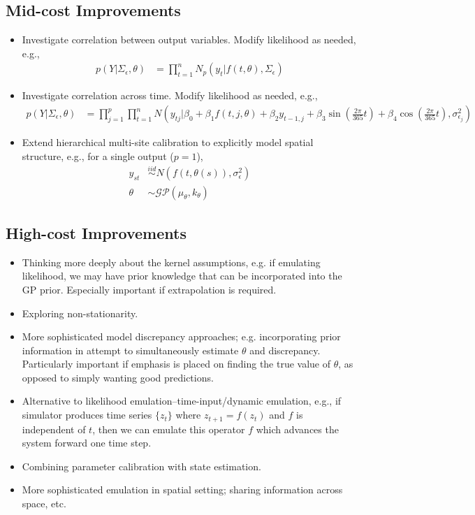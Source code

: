 \documentclass[12pt]{article}
\begin{document}
\subsection{Mid-cost Improvements}
\begin{itemize}
\item Investigate correlation between output variables. Modify likelihood as needed, e.g.,
	\begin{align}
	p(Y|\Sigma_\epsilon, \theta) &= \prod_{t = 1}^{n} N_p(y_{t}|f(t, \theta), \Sigma_{\epsilon}) \label{ind_output_corr}
	\end{align}
\item Investigate correlation across time. Modify likelihood as needed, e.g., 
	\begin{align}
	p(Y|\Sigma_\epsilon, \theta) &= \prod_{j = 1}^{p} \prod_{t = 1}^{n} N\left(y_{tj}|\beta_0 + \beta_1 f(t, j, \theta) + \beta_2 y_{t-1,j} + \beta_3 \sin\left(\frac{2\pi}{365}t\right) + \beta_4 \cos\left(\frac{2\pi}{365}t\right), \sigma^2_{\epsilon_j}\right) \label{ind_autocorr}
	\end{align}
\item Extend hierarchical multi-site calibration to explicitly model spatial structure, e.g., for a single output ($p=1$), 
	\begin{align}
	y_{st} &\overset{iid}{\sim} N(f(t, \theta(s)), \sigma^2_\epsilon) \\
	\theta &\sim \mathcal{GP}(\mu_\theta, k_\theta)
	\end{align}
\end{itemize}

\subsection{High-cost Improvements}
\begin{itemize}
\item Thinking more deeply about the kernel assumptions, e.g. if emulating likelihood, we may have prior knowledge that can be incorporated into the GP prior. Especially important if extrapolation is required.
\item Exploring non-stationarity. 
\item More sophisticated model discrepancy approaches; e.g. incorporating prior information in attempt to simultaneously estimate $\theta$ and discrepancy. Particularly important if emphasis is placed on finding 
the true value of $\theta$, as opposed to simply wanting good predictions. 
\item Alternative to likelihood emulation--time-input/dynamic emulation, e.g., if simulator produces time series $\{z_t\}$ where $z_{t + 1} = f(z_t)$ and $f$ is independent of $t$, then we can emulate this operator $f$ 
which advances the system forward one time step.
\item Combining parameter calibration with state estimation.  
\item More sophisticated emulation in spatial setting; sharing information across space, etc. 
\end{itemize}
\end{document}
